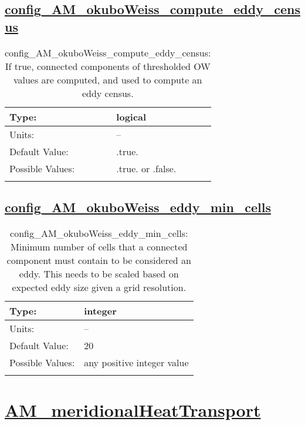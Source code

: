 \subsection[config\_AM\_okuboWeiss\_compute\_eddy\_census]{\hyperref[sec:nm_tab_AM_okuboWeiss]{config\_AM\_okuboWeiss\_compute\_eddy\_census}}
\label{subsec:nm_sec_config_AM_okuboWeiss_compute_eddy_census}
\begin{center}
\begin{longtable}{| p{2.0in} || p{4.0in} |}
    \hline
    Type: & logical \\
    \hline
    Units: & -- \\
    \hline
    Default Value: & .true. \\
    \hline
    Possible Values: & .true. or .false. \\
    \hline
    \caption{config\_AM\_okuboWeiss\_compute\_eddy\_census: If true, connected components of thresholded OW values are computed, and used to compute an eddy census.}
\end{longtable}
\end{center}
\subsection[config\_AM\_okuboWeiss\_eddy\_min\_cells]{\hyperref[sec:nm_tab_AM_okuboWeiss]{config\_AM\_okuboWeiss\_eddy\_min\_cells}}
\label{subsec:nm_sec_config_AM_okuboWeiss_eddy_min_cells}
\begin{center}
\begin{longtable}{| p{2.0in} || p{4.0in} |}
    \hline
    Type: & integer \\
    \hline
    Units: & -- \\
    \hline
    Default Value: & 20 \\
    \hline
    Possible Values: & any positive integer value \\
    \hline
    \caption{config\_AM\_okuboWeiss\_eddy\_min\_cells: Minimum number of cells that a connected component must contain to be considered an eddy. This needs to be scaled based on expected eddy size given a grid resolution.}
\end{longtable}
\end{center}
\section[AM\_meridionalHeatTransport]{\hyperref[sec:nm_tab_AM_meridionalHeatTransport]{AM\_meridionalHeatTransport}}
\label{sec:nm_sec_AM_meridionalHeatTransport}
